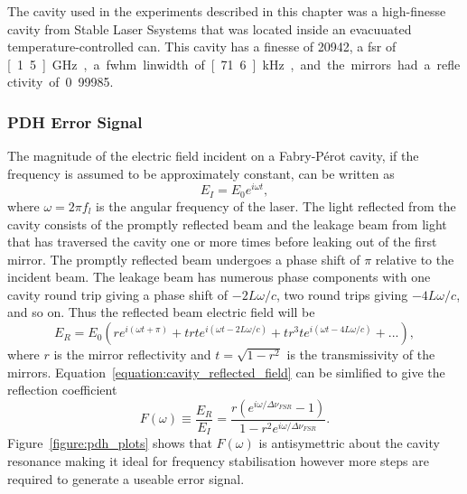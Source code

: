 The cavity used in the experiments described in this chapter was a high-finesse cavity from Stable Laser Ssystems that was located inside an evacuuated temperature-controlled can.
This cavity has a finesse of 20942, a \gls{fsr} of \unit[1.5]{GHz}, a \gls{fwhm} linwidth of \unit[71.6]{kHz}, and the mirrors had a reflectivity of 0.99985.

\subsubsection{PDH Error Signal}\label{section:pdh_error}

The magnitude of the electric field incident on a Fabry-P\'erot cavity, if the frequency is assumed to be approximately constant, can be written as
\begin{equation}
E_{I} = E_0 e^{i\omega t},
\end{equation}
where $\omega=2\pi f_l$ is the angular frequency of the laser.
The light reflected from the cavity consists of the promptly reflected beam and the leakage beam from light that has traversed the cavity one or more times before leaking out of the first mirror.
The promptly reflected beam undergoes a phase shift of $\pi$ relative to the incident beam.
The leakage beam has numerous phase components with one cavity round trip giving a phase shift of $-2L\omega/c$, two round trips giving $-4L\omega/c$, and so on.
Thus the reflected beam electric field will be
\begin{equation}\label{equation:cavity_reflected_field}
E_R = E_0 \left( r e^{i\left(\omega t + \pi\right)} + t r t e^{i\left(\omega t -2L\omega/c\right)} + t r^3 t e^{i\left(\omega t -4L\omega/c\right)} + ...\right),
\end{equation}
where $r$ is the mirror reflectivity and $t=\sqrt{1-r^2}$ is the transmissivity of the mirrors.
Equation~\ref{equation:cavity_reflected_field} can be simlified to give the reflection coefficient
\begin{equation}\label{equation:reflection_coefficient}
F(\omega) \equiv \frac{E_R}{E_I} = \frac{r\left(e^{i\omega / \Delta\nu_{FSR}} - 1 \right)}{1-r^2 e^{i\omega / \Delta\nu_{FSR}}}.
\end{equation}
Figure~\ref{figure:pdh_plots} shows that $F(\omega)$ is antisymettric about the cavity resonance making it ideal for frequency stabilisation however more steps are required to generate a useable error signal.

